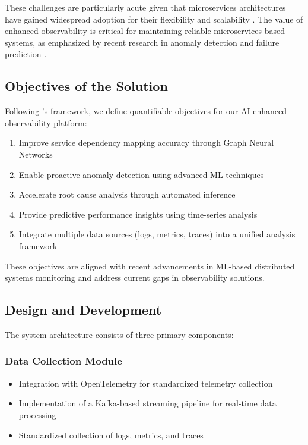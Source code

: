 \documentclass[10pt,journal,compsoc]{IEEEtran}
\begin{document}
These challenges are particularly acute given that microservices architectures have gained widespread adoption for their flexibility and scalability \cite{zhang2023automatic}. The value of enhanced observability is critical for maintaining reliable microservices-based systems, as emphasized by recent research in anomaly detection and failure prediction \cite{nobre2023investigation}.

\subsection{Objectives of the Solution}

Following \cite{peffers2007design}'s framework, we define quantifiable objectives for our AI-enhanced observability platform:

\begin{enumerate}
    \item Improve service dependency mapping accuracy through Graph Neural Networks
    \item Enable proactive anomaly detection using advanced ML techniques
    \item Accelerate root cause analysis through automated inference
    \item Provide predictive performance insights using time-series analysis
    \item Integrate multiple data sources (logs, metrics, traces) into a unified analysis framework
\end{enumerate}

These objectives are aligned with recent advancements in ML-based distributed systems monitoring \cite{kohyarnejadfard2022innovative} and address current gaps in observability solutions.

\subsection{Design and Development}

The system architecture consists of three primary components:

\subsubsection{Data Collection Module}
\begin{itemize}
    \item Integration with OpenTelemetry for standardized telemetry collection
    \item Implementation of a Kafka-based streaming pipeline for real-time data processing
    \item Standardized collection of logs, metrics, and traces
\end{itemize}
\end{document}

